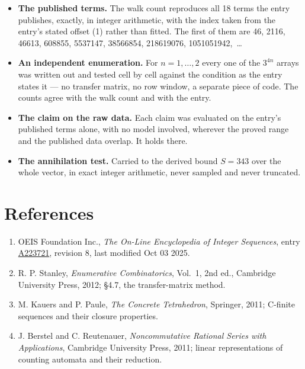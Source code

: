 \documentclass[11pt]{article}
\theoremstyle{definition}
\begin{document}
\begin{itemize}

\item {\bfseries The published terms.} The walk count reproduces all 18 terms the entry publishes, exactly, in integer arithmetic, with the index taken from the entry's stated offset (1) rather than fitted. The first of them are 46, 2116, 46613, 608855, 5537147, 38566854, 218619076, 1051051942,~\dots

\item {\bfseries An independent enumeration.} For $n = 1,\dots,2$ every one of the $3^{4n}$ arrays was written out and tested cell by cell against the condition as the entry states it --- no transfer matrix, no row window, a separate piece of code. The counts agree with the walk count and with the entry.

\item {\bfseries The claim on the raw data.} Each claim was evaluated on the entry's published terms alone, with no model involved, wherever the proved range and the published data overlap. It holds there.

\item {\bfseries The annihilation test.} Carried to the derived bound $S = 343$ over the whole vector, in exact integer arithmetic, never sampled and never truncated.

\end{itemize}

\section{References}

\begin{enumerate}

\item OEIS Foundation Inc., \emph{The On-Line Encyclopedia of Integer Sequences}, entry \href{https://oeis.org/A223721}{A223721}, revision 8, last modified Oct 03 2025.

\item R. P. Stanley, \emph{Enumerative Combinatorics}, Vol.~1, 2nd ed., Cambridge University Press, 2012; \S4.7, the transfer-matrix method.

\item M. Kauers and P. Paule, \emph{The Concrete Tetrahedron}, Springer, 2011; C-finite sequences and their closure properties.

\item J. Berstel and C. Reutenauer, \emph{Noncommutative Rational Series with Applications}, Cambridge University Press, 2011; linear representations of counting automata and their reduction.

\end{enumerate}
\end{document}
